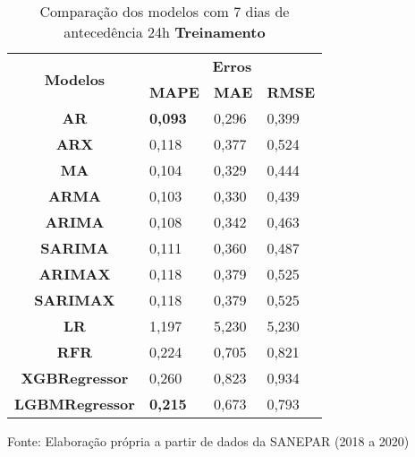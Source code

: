 \begin{table}[H]
	\centering
	\caption{Comparação dos modelos com 7 dias de antecedência 24h \textbf{Treinamento} }\label{tb:10-24trn}
	\begin{tabular}{@{}clll@{}}
		\toprule
		\multirow{2}{*}{\textbf{Modelos}} & \multicolumn{3}{c}{\textbf{Erros}}                                                                       \\ \cmidrule(l){2-4} 
		& \multicolumn{1}{c}{\textbf{MAPE}} & \multicolumn{1}{c}{\textbf{MAE}} & \multicolumn{1}{c}{\textbf{RMSE}} \\ \hline
\textbf{AR}                       & \textbf{0,093}                             & 0,296                            & 0,399                             \\
\textbf{ARX}                      & 0,118                             & 0,377                            & 0,524                             \\
\textbf{MA}                       & 0,104                             & 0,329                            & 0,444                             \\
\textbf{ARMA}                     & 0,103                             & 0,330                            & 0,439                             \\
\textbf{ARIMA}                    & 0,108                             & 0,342                            & 0,463                             \\
\textbf{SARIMA}                   & 0,111                             & 0,360                            & 0,487                             \\
\textbf{ARIMAX}                   & 0,118                             & 0,379                            & 0,525                             \\
\textbf{SARIMAX}                  & 0,118                             & 0,379                            & 0,525                             \\
\textbf{LR}                       & 1,197                             & 5,230                            & 5,230                             \\
\textbf{RFR}                      & 0,224                             & 0,705                            & 0,821                             \\
\textbf{XGBRegressor}             & 0,260                             & 0,823                            & 0,934                             \\
\textbf{LGBMRegressor}            & \textbf{0,215 }                            & 0,673                            & 0,793                             \\ \bottomrule
	\end{tabular}

Fonte: Elaboração própria a partir de dados da SANEPAR (2018 a 2020)
\end{table}

